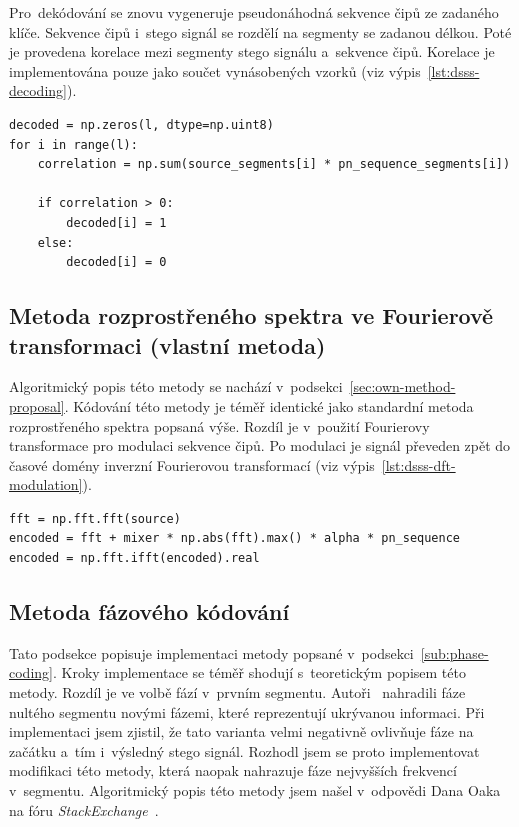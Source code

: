 Pro~dekódování se znovu vygeneruje pseudonáhodná sekvence čipů ze zadaného
klíče. Sekvence čipů i~stego signál se rozdělí na segmenty se zadanou délkou.
Poté je provedena korelace mezi segmenty stego signálu a~sekvence čipů.
Korelace je implementována pouze jako součet vynásobených vzorků (viz
výpis~\ref{lst:dsss-decoding}).

\begin{lstlisting}[language=PythonPlus, label={lst:dsss-decoding},
caption={Korelace segmentů a~rozhodovací pravidlo.}]
decoded = np.zeros(l, dtype=np.uint8)
for i in range(l):
    correlation = np.sum(source_segments[i] * pn_sequence_segments[i])

    if correlation > 0:
        decoded[i] = 1
    else:
        decoded[i] = 0
\end{lstlisting}

\subsection*{Metoda rozprostřeného spektra ve Fourierově transformaci (vlastní
metoda)}
\label{sub:dsssdft-implementation}

Algoritmický popis této metody se nachází
v~podsekci~\ref{sec:own-method-proposal}. Kódování této metody je téměř
identické jako standardní metoda rozprostřeného spektra popsaná výše. Rozdíl je
v~použití Fourierovy transformace pro modulaci sekvence čipů. Po modulaci je
signál převeden zpět do časové domény inverzní Fourierovou transformací (viz
výpis~\ref{lst:dsss-dft-modulation}).

\begin{lstlisting}[language=PythonPlus, label={lst:dsss-dft-modulation},
caption={Modulace Fourierovy transformace krycího signálu, rozprostřených bitů
a~pseudonáhodné sekvence čipů.}]
fft = np.fft.fft(source)
encoded = fft + mixer * np.abs(fft).max() * alpha * pn_sequence
encoded = np.fft.ifft(encoded).real
\end{lstlisting}

\subsection*{Metoda fázového kódování}
\label{sub:phase-coding-implementation}

Tato podsekce popisuje implementaci metody popsané
v~podsekci~\ref{sub:phase-coding}. Kroky implementace se téměř shodují
s~teoretickým popisem této metody. Rozdíl je ve volbě fází v~prvním segmentu.
Autoři~\cite{Bender1996} nahradili fáze nultého segmentu novými fázemi, které
reprezentují ukrývanou informaci. Při implementaci jsem zjistil, že tato
varianta velmi negativně ovlivňuje fáze na začátku a~tím i~výsledný stego
signál. Rozhodl jsem se proto implementovat modifikaci této metody, která
naopak nahrazuje fáze nejvyšších frekvencí v~segmentu. Algoritmický popis této
metody jsem našel v~odpovědi Dana Oaka na fóru
\textit{StackExchange}~\cite{PhaseStackExchange}.

